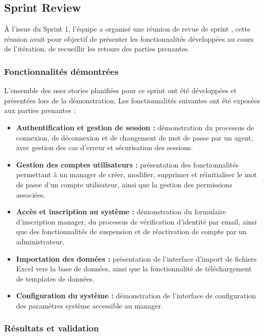 \documentclass[a4paper,12pt]{report}
\begin{document}
\subsection{Sprint Review}

À l'issue du Sprint 1, l'équipe a organisé une réunion de revue de sprint , cette réunion avait pour objectif de présenter les fonctionnalités développées au cours de l'itération, de recueillir les retours des parties prenantes.

\subsubsection*{Fonctionnalités démontrées}

L'ensemble des user stories planifiées pour ce sprint ont été développées et 
présentées lors de la démonstration. Les fonctionnalités suivantes ont été 
exposées aux parties prenantes :

\begin{itemize}
    \item \textbf{Authentification et gestion de session :} démonstration du 
    processus de connexion, de déconnexion et de changement de mot de passe 
    par un agent, avec gestion des cas d'erreur et sécurisation des sessions.

    \item \textbf{Gestion des comptes utilisateurs :} présentation des 
    fonctionnalités permettant à un manager de créer, modifier, supprimer 
    et réinitialiser le mot de passe d'un compte utilisateur, ainsi que la 
    gestion des permissions associées.

    \item \textbf{Accès et inscription au système :} démonstration du 
    formulaire d'inscription manager, du processus de vérification d'identité 
    par email, ainsi que des fonctionnalités de suspension et de réactivation 
    de compte par un administrateur.

    \item \textbf{Importation des données :} présentation de l'interface 
    d'import de fichiers Excel vers la base de données, ainsi que la 
    fonctionnalité de téléchargement de templates de données.

    \item \textbf{Configuration du système :} démonstration de l'interface 
    de configuration des paramètres système accessible au manager.
\end{itemize}

\subsubsection*{Résultats et validation}
\end{document}
